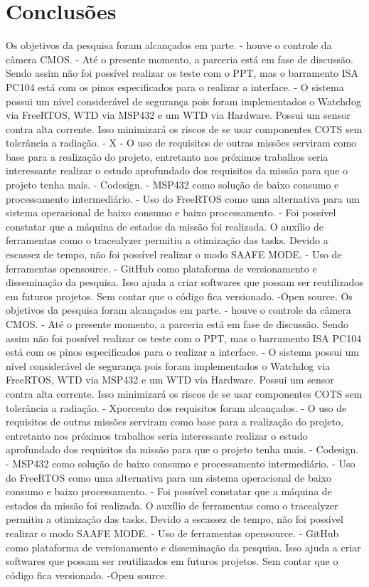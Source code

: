 \section{Conclusões}
Os objetivos da pesquisa foram alcançados em parte.
- houve o controle da câmera CMOS.
- Até o presente momento, a parceria está em fase de discussão. Sendo assim não foi possível realizar os teste com o PPT, mas o barramento ISA PC104 está com os pinos especificados para o realizar a interface.
- O sistema possui um nível considerável de segurança pois foram implementados o Watchdog via FreeRTOS, WTD via MSP432 e um WTD via Hardware. Possui um sensor contra alta corrente. Isso minimizará os riscos de se usar componentes COTS sem tolerância a radiação.
- X%
- O uso de requisitos de outras missões serviram como base para a realização do projeto, entretanto nos próximos trabalhos seria interessante realizar o estudo aprofundado dos requisitos da missão para que o projeto tenha mais. 
- Codesign. 
- MSP432 como solução de baixo consumo e processamento intermediário. 
- Uso do FreeRTOS como uma alternativa para um sistema operacional de baixo consumo e baixo processamento. 
- Foi possível constatar que a máquina de estados da missão foi realizada. O auxílio de ferramentas como o tracealyzer permitiu a otimização das tasks. Devido a escassez de tempo, não foi possível realizar o modo SAAFE MODE.
- Uso de ferramentas opensource.
- GitHub como plataforma de versionamento e disseminação da pesquisa. Isso ajuda a criar softwares que possam ser reutilizados em futuros projetos. Sem contar que o código fica versionado.
-Open source.
Os objetivos da pesquisa foram alcançados em parte.
- houve o controle da câmera CMOS.
- Até o presente momento, a parceria está em fase de discussão. Sendo assim não foi possível realizar os teste com o PPT, mas o barramento ISA PC104 está com os pinos especificados para o realizar a interface.
- O sistema possui um nível considerável de segurança pois foram implementados o Watchdog via FreeRTOS, WTD via MSP432 e um WTD via Hardware. Possui um sensor contra alta corrente. Isso minimizará os riscos de se usar componentes COTS sem tolerância a radiação.
- Xporcento dos requisitos foram alcançados. 
- O uso de requisitos de outras missões serviram como base para a realização do projeto, entretanto nos próximos trabalhos seria interessante realizar o estudo aprofundado dos requisitos da missão para que o projeto tenha mais. 
- Codesign. 
- MSP432 como solução de baixo consumo e processamento intermediário. 
- Uso do FreeRTOS como uma alternativa para um sistema operacional de baixo consumo e baixo processamento. 
- Foi possível constatar que a máquina de estados da missão foi realizada. O auxílio de ferramentas como o tracealyzer permitiu a otimização das tasks. Devido a escassez de tempo, não foi possível realizar o modo SAAFE MODE.
- Uso de ferramentas opensource.
- GitHub como plataforma de versionamento e disseminação da pesquisa. Isso ajuda a criar softwares que possam ser reutilizados em futuros projetos. Sem contar que o código fica versionado.
-Open source.


